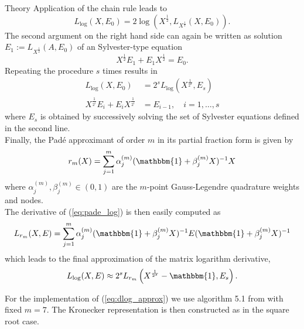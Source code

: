 \begin{chapter}{Theory}
Application of the chain rule leads to
\begin{equation}
    L_{\log}(X,E_0) = 2\log\left(X^{\frac{1}{2}},L_{X^{\frac{1}{2}}}(X,E_0)\right).
\end{equation}
The second argument on the right hand side can again be written as solution $E_1:=L_{X^{\frac{1}{2}}}(A,E_0)$ of an Sylvester-type equation
\begin{equation}
    X^{\frac{1}{2}}E_1+E_{1}X^{\frac{1}{2}}=E_0.
\end{equation}
Repeating the procedure $s$ times results in
\begin{align}
    L_{\log}(X,E_0)&=2^sL_{\log}\left(X^{\frac{1}{2^s}},E_s\right)\\
    X^{\frac{1}{2^{i}}}E_i+E_iX^{\frac{1}{2^{i}}}&=E_{i-1},\quad i=1,\ldots,s
\end{align}
where $E_s$ is obtained by successively solving the set of Sylvester equations defined in the second line.\\

Finally, the Pad\'{e} approximant of order $m$ in its partial fraction form \cite{HighamPade} is given by
\begin{equation}
    \label{eq:pade_log}
    r_m(X) = \sum_{j=1}^{m}\alpha_j^{(m)}(\mathbbm{1}+\beta_j^{(m)}X)^{-1}X
\end{equation}
where $\alpha_{j}^{(m)},\beta_{j}^{(m)}\in (0,1)$ are the $m$-point Gauss-Legendre quadrature weights and nodes.\\

The derivative of (\ref{eq:pade_log}) is then easily computed as 
\begin{equation}
    L_{r_m}(X,E) = \sum_{j=1}^m\alpha_j^{(m)}(\mathbbm{1}+\beta_j^{(m)}X)^{-1}E(\mathbbm{1}+\beta_j^{(m)}X)^{-1}
\end{equation}
which leads to the final approximation of the matrix logarithm derivative, 
\begin{equation}
    \label{eq:dlog_approx}
    L_{\log}(X,E)\approx 2^{s}L_{r_m}\left(X^{\frac{1}{2^s}}-\mathbbm{1},E_s \right).
\end{equation}

For the implementation of (\ref{eq:dlog_approx}) we use algorithm 5.1 from \cite{AlmohyFrechet} with fixed $m=7$.
The Kronecker representation is then constructed as in the square root case.








\end{chapter}
